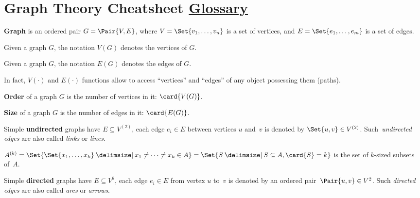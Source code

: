 \documentclass[a4paper,10pt]{article}
\begin{document}

\setcounter{section}{4}%
\section{Graph Theory Cheatsheet%
\texorpdfstring{\normalsize\hfill\href{https://en.wikipedia.org/wiki/Glossary_of_graph_theory}{Glossary}}{}}

\begin{terms}
    \item \textbf{Graph} is an ordered pair $G = \Pair{V, E}$, where $V = \Set{v_1,\dotsc,v_n}$ is a set of vertices, and $E = \Set{e_1,\dotsc,e_m}$ is a set of edges.
    \begin{terms}
        \item Given a graph $G$, the notation $V(G)$ denotes the vertices of $G$.
        \item Given a graph $G$, the notation $E(G)$ denotes the edges of $G$.
        \item In fact, $V({\cdot})$ and $E({\cdot})$ functions allow to access \enquote{vertices} and \enquote{edges} of any object possessing them (\eg paths).
    \end{terms}

    \item \textbf{Order} of a graph $G$ is the number of vertices in it: $\card{V(G)}$.
    \item \textbf{Size} of a graph $G$ is the number of edges in it: $\card{E(G)}$.

    \item Simple \textbf{undirected} graphs have $E \subseteq V^{(2)}$, \ie each edge $e_i \in E$ between vertices $u$ and~$v$ is denoted by $\Set{u,v} \in V^{(2)}$.
    Such~\emph{undirected edges} are also called \emph{links} or \emph{lines}.

    \begin{terms}
        \item $A^{(k)} = \Set{\Set{x_1,\dotsc,x_k} \given x_1 \neq \dotsb \neq x_k \in A} = \Set{ S \given S \subseteq A, \card{S} = k }$ is the set of $k$-sized subsets of~$A$.
    \end{terms}

    \item Simple \textbf{directed} graphs have $E \subseteq V^{2}$, \ie each edge $e_i \in E$ from vertex $u$ to~$v$ is denoted by an ordered pair~$\Pair{u,v} \in V^{2}$.
    Such \emph{directed edges} are also called \emph{arcs} or \emph{arrows}.


\end{terms}
\end{document}

